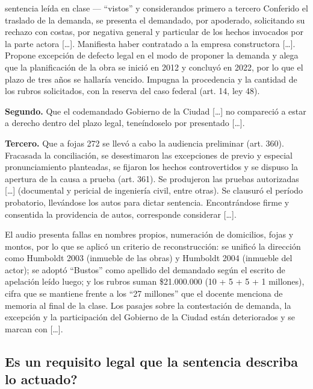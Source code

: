\documentclass[12pt,oneside]{book}
\begin{document}
\begin{example}{sentencia le\'ida en clase --- ``vistos'' y considerandos primero a tercero}
Conferido el traslado de la demanda, se presenta el demandado, por apoderado, solicitando su rechazo con costas, por negativa general y particular de los hechos invocados por la parte actora [\ldots]. Manifiesta haber contratado a la empresa constructora [\ldots]. Propone excepci\'on de defecto legal en el modo de proponer la demanda y alega que la planificaci\'on de la obra se inici\'o en 2012 y concluy\'o en 2022, por lo que el plazo de tres a\~nos se hallar\'ia vencido. Impugna la procedencia y la cantidad de los rubros solicitados, con la reserva del caso federal (art. 14, ley 48).

\textbf{Segundo.} Que el codemandado Gobierno de la Ciudad [\ldots] no compareci\'o a estar a derecho dentro del plazo legal, tene\'indoselo por presentado [\ldots].

\textbf{Tercero.} Que a fojas 272 se llev\'o a cabo la audiencia preliminar (art. 360). Fracasada la conciliaci\'on, se desestimaron las excepciones de previo y especial pronunciamiento planteadas, se fijaron los hechos controvertidos y se dispuso la apertura de la causa a prueba (art. 361). Se produjeron las pruebas autorizadas [\ldots] (documental y pericial de ingenier\'ia civil, entre otras). Se clausur\'o el per\'iodo probatorio, llev\'andose los autos para dictar sentencia. Encontr\'andose firme y consentida la providencia de autos, corresponde considerar [\ldots].
\end{example}

\begin{note}
El audio presenta fallas en nombres propios, numeraci\'on de domicilios, fojas y montos, por lo que se aplic\'o un criterio de reconstrucci\'on: se unific\'o la direcci\'on como Humboldt 2003 (inmueble de las obras) y Humboldt 2004 (inmueble del actor); se adopt\'o ``Bustos'' como apellido del demandado seg\'un el escrito de apelaci\'on le\'ido luego; y los rubros suman \$21.000.000 (10 + 5 + 5 + 1 millones), cifra que se mantiene frente a los ``27 millones'' que el docente menciona de memoria al final de la clase. Los pasajes sobre la contestaci\'on de demanda, la excepci\'on y la participaci\'on del Gobierno de la Ciudad est\'an deteriorados y se marcan con [\ldots].
\end{note}

\subsection{\textquestiondown Es un requisito legal que la sentencia describa lo actuado?}
\end{document}
